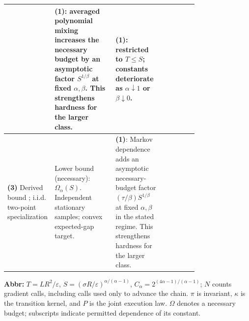 \begin{table}[tp]
\begin{threeparttable}
\begin{tabularx}{\linewidth}{@{}>{\raggedright\arraybackslash}p{0.20\linewidth}>{\raggedright\arraybackslash}p{0.32\linewidth}>{\raggedright\arraybackslash}p{0.25\linewidth}>{\raggedright\arraybackslash}X@{}}
& \textbf{(1)}: averaged polynomial mixing increases the necessary budget by an asymptotic factor $S^{1/\beta}$ at fixed $\alpha,\beta$. This strengthens hardness for the larger class.
& \textbf{(1)}: restricted to $T\le S$; constants deteriorate as $\alpha\downarrow1$ or $\beta\downarrow0$. \\
\midrule
\textbf{(3)} Derived bound \citep[App.~H.4]{pmhtSarkar2026v1}; i.i.d. two-point specialization
& Lower bound (necessary): $\Omega_\alpha(S)$. Independent stationary samples; convex expected-gap target.
& \textbf{(1)}: Markov dependence adds an asymptotic necessary-budget factor $(\tau/\beta)S^{1/\beta}$ at fixed $\alpha,\beta$ in the stated regime. This strengthens hardness for the larger class.
& \\
\bottomrule
\end{tabularx}
\begin{tablenotes}[flushleft]\footnotesize
\item[] \textbf{Abbr:} $T=LR^2/\varepsilon$, $S=(\sigma R/\varepsilon)^{\alpha/(\alpha-1)}$, $C_\alpha=2^{(4\alpha-1)/(\alpha-1)}$; $N$ counts gradient calls, including calls used only to advance the chain. $\pi$ is invariant, $\kappa$ is the transition kernel, and $P$ is the joint execution law. $\Omega$ denotes a necessary budget; subscripts indicate permitted dependence of its constant.
\end{tablenotes}
\end{threeparttable}
\end{table}
\clearpage
